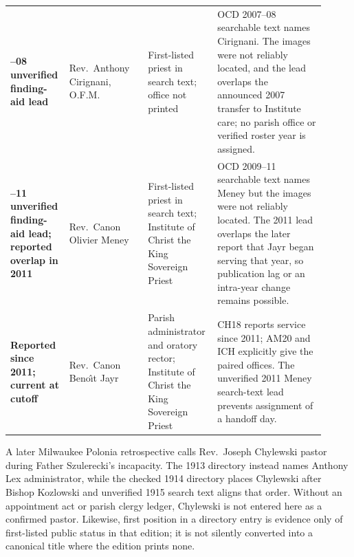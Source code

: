 \begin{longtable}{>{\bfseries\RaggedRight\arraybackslash}p{0.14\linewidth}>{\RaggedRight\arraybackslash}p{0.24\linewidth}>{\RaggedRight\arraybackslash}p{0.20\linewidth}>{\RaggedRight\arraybackslash}p{0.33\linewidth}}
2007--08 unverified finding-aid lead & Rev.~Anthony Cirignani, O.F.M. & First-listed priest in search text; office not printed & OCD 2007--08 searchable text names Cirignani. The images were not reliably located, and the lead overlaps the announced 2007 transfer to Institute care; no parish office or verified roster year is assigned.\\

2009--11 unverified finding-aid lead; reported overlap in 2011 & Rev.~Canon Olivier Meney & First-listed priest in search text; Institute of Christ the King Sovereign Priest & OCD 2009--11 searchable text names Meney but the images were not reliably located. The 2011 lead overlaps the later report that Jayr began serving that year, so publication lag or an intra-year change remains possible.\\

Reported since 2011; current at cutoff & Rev.~Canon Beno\^{\i}t Jayr & Parish administrator and oratory rector; Institute of Christ the King Sovereign Priest & CH18 reports service since 2011; AM20 and ICH explicitly give the paired offices. The unverified 2011 Meney search-text lead prevents assignment of a handoff day.\\
\end{longtable}

A later Milwaukee Polonia retrospective calls Rev.~Joseph Chylewski pastor
during Father Szulerecki's incapacity. The 1913 directory instead names Anthony
Lex administrator, while the checked 1914 directory places Chylewski after
Bishop Kozlowski and unverified 1915 search text aligns that order. Without an
appointment act or parish clergy ledger,
Chylewski is not entered here as a confirmed pastor. Likewise, first position
in a directory entry is evidence only of first-listed public status in that
edition; it is not silently converted into a canonical title where the edition
prints none.
